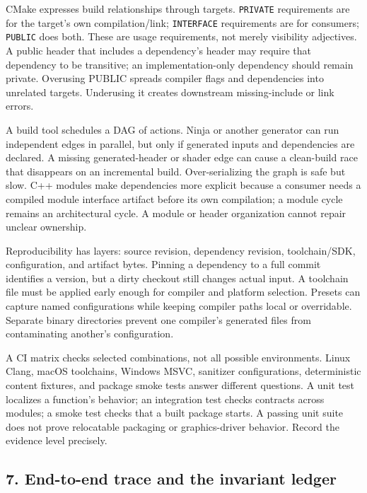 CMake expresses build relationships through targets. \texttt{PRIVATE} requirements are for the target's own compilation/link; \texttt{INTERFACE} requirements are for consumers; \texttt{PUBLIC} does both. These are usage requirements, not merely visibility adjectives. A public header that includes a dependency's header may require that dependency to be transitive; an implementation-only dependency should remain private. Overusing PUBLIC spreads compiler flags and dependencies into unrelated targets. Underusing it creates downstream missing-include or link errors.

A build tool schedules a DAG of actions. Ninja or another generator can run independent edges in parallel, but only if generated inputs and dependencies are declared. A missing generated-header or shader edge can cause a clean-build race that disappears on an incremental build. Over-serializing the graph is safe but slow. C++ modules make dependencies more explicit because a consumer needs a compiled module interface artifact before its own compilation; a module cycle remains an architectural cycle. A module or header organization cannot repair unclear ownership.

Reproducibility has layers: source revision, dependency revision, toolchain/SDK, configuration, and artifact bytes. Pinning a dependency to a full commit identifies a version, but a dirty checkout still changes actual input. A toolchain file must be applied early enough for compiler and platform selection. Presets can capture named configurations while keeping compiler paths local or overridable. Separate binary directories prevent one compiler's generated files from contaminating another's configuration.

A CI matrix checks selected combinations, not all possible environments. Linux Clang, macOS toolchains, Windows MSVC, sanitizer configurations, deterministic content fixtures, and package smoke tests answer different questions. A unit test localizes a function's behavior; an integration test checks contracts across modules; a smoke test checks that a built package starts. A passing unit suite does not prove relocatable packaging or graphics-driver behavior. Record the evidence level precisely.

\subsection{7. End-to-end trace and the invariant ledger}\label{05-engine-i-ch008-end-to-end-trace-and-the-invariant-ledger}

